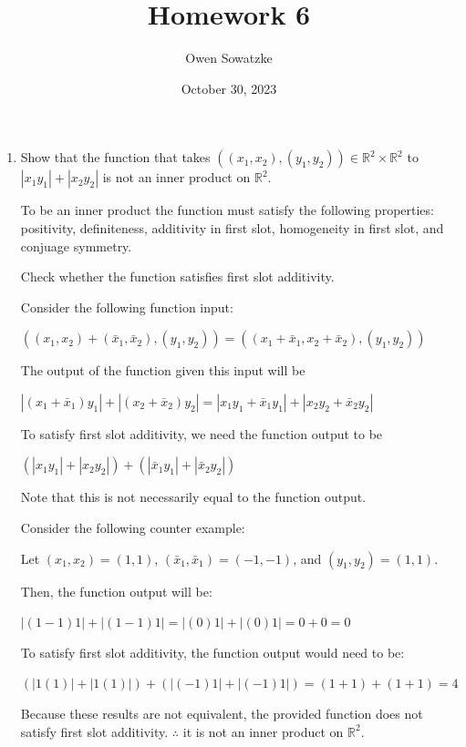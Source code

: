 \documentclass[fleqn]{article}
\title{Homework 6}
\author{Owen Sowatzke}
\date{October 30, 2023}
\newcommand{\zerodisplayskip}{
	\setlength{\abovedisplayskip}{0pt}%
	\setlength{\belowdisplayskip}{0pt}%
	\setlength{\abovedisplayshortskip}{0pt}%
	\setlength{\belowdisplayshortskip}{0pt}%
	\setlength{\mathindent}{0pt}}
\begin{document}
	\offinterlineskip
	\setlength{\lineskip}{12pt}
	\zerodisplayskip
	\maketitle
	
	\begin{enumerate}[nolistsep]
		\item Show that the function that takes $((x_1, x_2),(y_1,y_2)) \in \mathbb{R}^2 \times \mathbb{R}^2$ to \newline $|x_1y_1| + |x_2y_2|$ is not an inner product on $\mathbb{R}^2$.
		
			To be an inner product the function must satisfy the following properties: positivity, definiteness, additivity in first slot, homogeneity in first slot, and conjuage symmetry.
			
			Check whether the function satisfies first slot additivity.
			
			Consider the following function input:
			
			$((x_1, x_2) + (\bar{x}_1, \bar{x}_2),(y_1,y_2)) = ((x_1 + \bar{x}_1, x_2 + \bar{x}_2),(y_1,y_2))$
			
			The output of the function given this input will be
			
			$|(x_1 + \bar{x}_1)y_1| + |(x_2 + \bar{x}_2)y_2| = |x_1y_1 + \bar{x}_1y_1| + |x_2y_2 + \bar{x}_2y_2|$
			
			To satisfy first slot additivity, we need the function output to be
			
			$(|x_1y_1| + |x_2y_2|) + (|\bar{x}_1y_1| + |\bar{x}_2y_2|)$
			
			Note that this is not necessarily equal to the function output.
			
			Consider the following counter example:
			
			Let $(x_1,x_2) = (1,1)$, $(\bar{x}_1,\bar{x}_1) = (-1,-1)$, and $(y_1,y_2) = (1,1)$.
			
			Then, the function output will be:
			
			$|(1 - 1)1| + |(1 - 1)1| = |(0)1| + |(0)1| = 0 + 0 = 0$
			
			To satisfy first slot additivity, the function output would need to be:
			
			$(|1(1)| + |1(1)|) + (|(-1)1| + |(-1)1|) = (1 + 1) + (1 + 1) = 4$
			
			Because these results are not equivalent, the provided function does not satisfy first slot additivity. $\therefore$ it is not an inner product on $\mathbb{R}^2$.
			

\end{enumerate}
\end{document}
